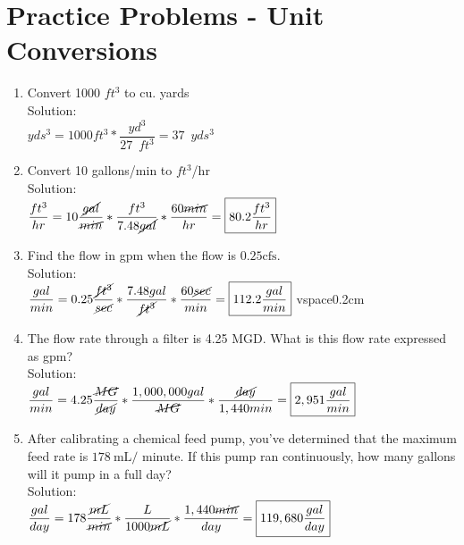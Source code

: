 \section*{Practice Problems - Unit Conversions} 
\begin{enumerate}

\item Convert 1000 $ft^3$ to cu. yards\\
Solution:\\
\vspace{0.2cm}
$yds^3=1000ft^3*\dfrac{yd^3}{27 \enspace ft^3}=\boxed{37 \enspace yds^3}$\\
\vspace{0.2cm}

\item Convert 10 gallons/min to $ft^3$/hr\\
Solution:\\
\vspace{0.2cm}
$\dfrac{ft^3}{hr}=10\dfrac{\cancel{gal}}{\cancel{min}}*\dfrac{ft^3}{7.48\cancel{gal}}*\dfrac{60\cancel{min}}{hr}=\boxed{80.2 \dfrac{ft^3}{hr}}$
\vspace{0.2cm}

\item Find the flow in gpm when the flow is $0.25 \mathrm{cfs}$.\\
Solution:\\
\vspace{0.2cm}
$\dfrac{gal}{min}=0.25\dfrac{\cancel{ft^3}}{\cancel{sec}}*\dfrac{7.48gal}{\cancel{ft^3}}*\dfrac{60\cancel{sec}}{min}=\boxed{112.2 \dfrac{gal}{min}}$
vspace{0.2cm}

\item The flow rate through a filter is 4.25 MGD. What is this flow rate expressed as gpm?\\
Solution:\\
\vspace{0.2cm}
$\dfrac{gal}{min}=4.25\dfrac{\cancel{MG}}{\cancel{day}}*\dfrac{1,000,000gal}{\cancel{MG}}*\dfrac{\cancel{day}}{1,440min}=\boxed{2,951 \dfrac{gal}{min}}$
\vspace{0.2cm}

\item After calibrating a chemical feed pump, you've determined that the maximum feed rate is $178 \mathrm{~mL} /$ minute. If this pump ran continuously, how many gallons will it pump in a full day?\\
Solution:\\
\vspace{0.2cm}
$\dfrac{gal}{day}=178\dfrac{\cancel{mL}}{\cancel{min}}*\dfrac{L}{1000\cancel{mL}}*\dfrac{1,440\cancel{min}}{day}=\boxed{119,680 \dfrac{gal}{day}}$



\end{enumerate}
